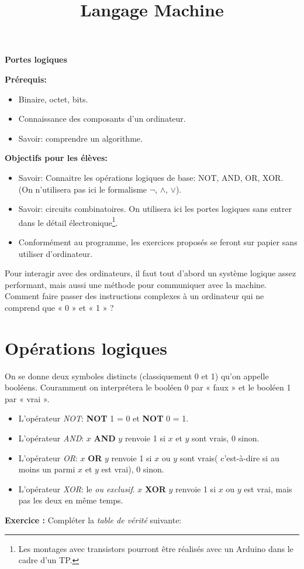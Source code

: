 \documentclass{article}
\title{Langage Machine}
\newcounter{exo}
\newcommand{\exercice}{
\stepcounter{exo}
\noindent\textbf{Exercice \theexo :}
}
\begin{document}
\renewcommand \footrulewidth{.2pt}%
\pagestyle{fancy}
\begin{center}
	\Large\textbf{Portes logiques}
\end{center}
\textbf{Prérequis:}
\begin{itemize}
\setlength{\itemsep}{1pt}
     \setlength{\parskip}{0pt}
     \setlength{\parsep}{0pt}
	\item Binaire, octet, bits.
	\item Connaissance des composants d'un ordinateur.
	\item Savoir: comprendre un algorithme.
\end{itemize}
\textbf{Objectifs pour les élèves:}
\begin{itemize}
\setlength{\itemsep}{1pt}
     \setlength{\parskip}{0pt}
     \setlength{\parsep}{0pt}
	\item Savoir: Connaitre les opérations logiques de base: NOT, AND, OR, XOR. (On n'utilisera pas ici le formalisme $\neg$, $\wedge$,    $\vee$).
	\item Savoir: circuits combinatoires. On utilisera ici les portes logiques sans entrer dans le détail électronique\footnote{Les montages avec transistors pourront être réalisés avec un Arduino dans le cadre d'un TP.}.
	\item Conformément au programme, les exercices proposés se feront sur papier sans utiliser d'ordinateur.
\end{itemize}
Pour interagir avec des ordinateurs, il faut tout d’abord un système logique assez performant, mais aussi une méthode pour communiquer avec la machine. Comment faire passer des instructions complexes à un ordinateur qui ne comprend que « 0 » et « 1 » ?
\section{Opérations logiques}
On se donne deux symboles distincts (classiquement 0 et 1) qu'on appelle booléens. Couramment on interprétera le booléen 0 par « faux » et le booléen 1 par « vrai ». 
\begin{itemize}
\setlength{\itemsep}{1pt}
     \setlength{\parskip}{0pt}
     \setlength{\parsep}{0pt}
	\item L'opérateur \emph{NOT}: \textbf{NOT} 1 = 0 et \textbf{NOT} 0 = 1.
	\item L'opérateur \emph{AND}: $x$ \textbf{AND} $y$ renvoie  1 si $x$ et $y$ sont vrais, 0 sinon.
	\item L'opérateur \emph{OR}: $x$ \textbf{OR} $y$ renvoie 1 si $x$ ou $y$ sont vrais( c'est-à-dire si au moins un parmi $x$ et $y$ est vrai), 0 sinon.
	\item L'opérateur \emph{XOR}: le \emph{ou exclusif}. $x$ \textbf{XOR} $y$ renvoie 1 si $x$ ou $y$ est vrai, mais pas les deux en même temps.
\end{itemize}
\exercice Compléter la \emph{table de vérité} suivante:
\end{document}
